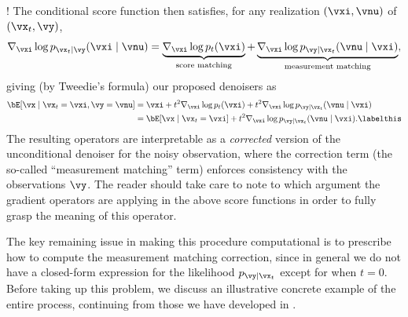 \documentclass[../../book-main.tex]{subfiles}
\begin{document}
!
The conditional score function then satisfies, for any realization $(\vxi,
\vnu)$ of $(\vx_t, \vy)$,
\begin{equation}
  \nabla_{\vxi} \log p_{\vx_t \mid \vy}(\vxi\mid \vnu)
  =
  \underbrace{\nabla_{\vxi} \log p_t(\vxi)}_{\text{score matching}}
  +
  \underbrace{\nabla_{\vxi} \log p_{\vy \mid \vx_t}(\vnu \mid \vxi)}_{\text{measurement matching}},
  \label{eqn:conditional-denoising-score}
\end{equation}
giving (by Tweedie's formula) our proposed denoisers as
\begin{align*}
  \bE[ \vx \mid \vx_t=\vxi, \vy=\vnu]
  &=
  \vxi + t^2 \nabla_{\vxi}\log p_t(\vxi) + t^2 \nabla_{\vxi}\log p_{\vy \mid
  \vx_t}(\vnu \mid \vxi)
  \\
  &=
  \bE[\vx \mid \vx_t=\vxi] + t^2 \nabla_{\vxi}\log p_{\vy \mid \vx_t}(\vnu\mid
  \vxi).
  \labelthis \label{eq:posterior-sampling-denoiser-decomposition}
\end{align*}
The resulting operators are interpretable as a \textit{corrected} version of the
unconditional denoiser for the noisy observation, where the correction term (the
so-called ``measurement matching'' term) enforces consistency with the
observations $\vy$. The reader should take care to note to which argument the
gradient operators are applying in the above score functions in order to fully
grasp the meaning of this operator.

The key remaining issue in making this procedure computational is to prescribe
how to compute the measurement matching correction, since in general we do not
have a closed-form
expression for the likelihood $p_{\vy \mid \vx_t}$ except for when $t
= 0$. Before taking up this problem, we discuss an illustrative concrete example
of the entire process, continuing from those we have developed in
.
\end{document}
